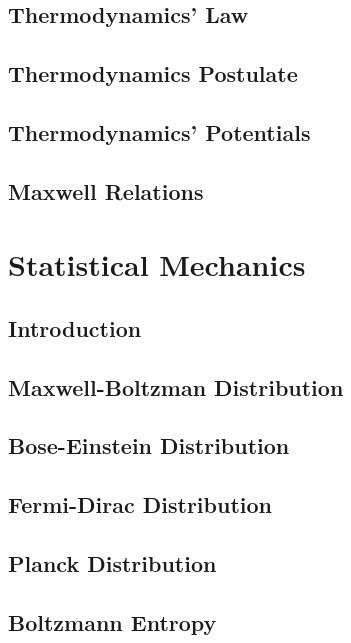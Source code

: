 \documentclass[10pt]{report}
\begin{document}
\section*{Thermodynamics' Law}
\clearpage

\section*{Thermodynamics Postulate}
\clearpage

\section*{Thermodynamics' Potentials}
\clearpage

\section*{Maxwell Relations}
\clearpage

\chapter*{Statistical Mechanics}

\section*{Introduction}
\clearpage

\section*{Maxwell-Boltzman Distribution}
\clearpage

\section*{Bose-Einstein Distribution}
\clearpage

\section*{Fermi-Dirac Distribution}
\clearpage

\section*{Planck Distribution}
\clearpage

\section*{Boltzmann Entropy}
\clearpage

\printbibliography
\end{document}
